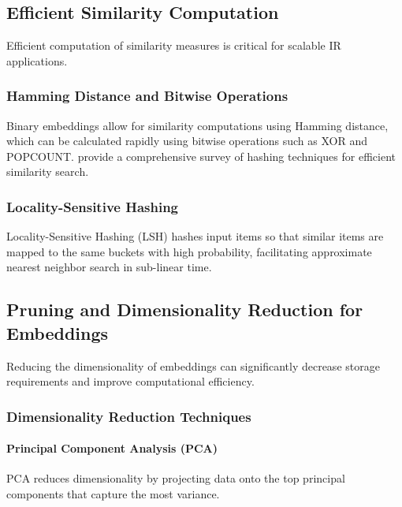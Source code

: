 \subsection{Efficient Similarity Computation}  
  
Efficient computation of similarity measures is critical for scalable IR applications.  
  
\subsubsection{Hamming Distance and Bitwise Operations}  
  
Binary embeddings allow for similarity computations using Hamming distance, which can be calculated rapidly using bitwise operations such as XOR and POPCOUNT. \citet{wang2017survey} provide a comprehensive survey of hashing techniques for efficient similarity search.  
  
\subsubsection{Locality-Sensitive Hashing}  
  
Locality-Sensitive Hashing (LSH) \cite{andoni2006near} hashes input items so that similar items are mapped to the same buckets with high probability, facilitating approximate nearest neighbor search in sub-linear time.  
  
\subsection{Pruning and Dimensionality Reduction for Embeddings}  
  
Reducing the dimensionality of embeddings can significantly decrease storage requirements and improve computational efficiency.  
  
\subsubsection{Dimensionality Reduction Techniques}  
  
\paragraph{Principal Component Analysis (PCA)}  
  
PCA \cite{jolliffe2016principal} reduces dimensionality by projecting data onto the top principal components that capture the most variance.  
  
